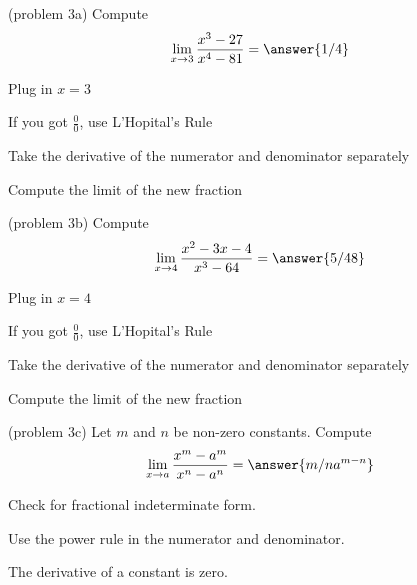 \documentclass[handout]{ximera}
\begin{document}
\begin{problem}(problem 3a)
  Compute
  \[
  \lim_{x \to 3} \frac{x^3 - 27}{x^4 - 81} = \answer{1/4}
  \]
  
    \begin{hint}
      Plug in $x=3$
    \end{hint}
    \begin{hint}
      If you got $\frac00$, use L'Hopital's Rule
    \end{hint}
    \begin{hint}
      Take the derivative of the numerator and denominator separately
    \end{hint}
	  \begin{hint}
      Compute the limit of the new fraction
    \end{hint}
  
\end{problem}


\begin{problem}(problem 3b)
  Compute
  \[
  \lim_{x \to 4} \frac{x^2 - 3x - 4}{x^3 - 64} = \answer{5/48}
  \]
  
    \begin{hint}
      Plug in $x=4$
    \end{hint}
    \begin{hint}
      If you got $\frac00$, use L'Hopital's Rule
    \end{hint}
    \begin{hint}
      Take the derivative of the numerator and denominator separately
    \end{hint}
	  \begin{hint}
      Compute the limit of the new fraction
    \end{hint}
  
\end{problem}


\begin{problem}(problem 3c)
  Let $m$ and $n$ be non-zero constants. Compute
  \[
  \lim_{x \to a} \frac{x^m - a^m}{x^n - a^n} = \answer{m/n a^{m-n}}
  \]
  
    \begin{hint}
      Check for fractional indeterminate form.
    \end{hint}
    \begin{hint}
      Use the power rule in the numerator and denominator.
    \end{hint}
	  \begin{hint}
      The derivative of a constant is zero.
    \end{hint}
  
\end{problem}
\end{document}
